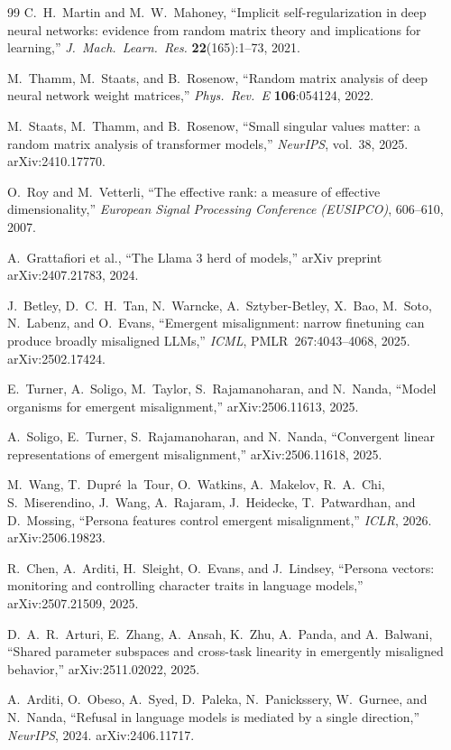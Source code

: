 \documentclass[11pt]{article}
\theoremstyle{definition}
\theoremstyle{remark}
\begin{document}
\begin{thebibliography}{99}
C.~H.~Martin and M.~W.~Mahoney,
``Implicit self-regularization in deep neural networks: evidence from random matrix theory
and implications for learning,''
\emph{J.\ Mach.\ Learn.\ Res.} \textbf{22}(165):1--73, 2021.

M.~Thamm, M.~Staats, and B.~Rosenow,
``Random matrix analysis of deep neural network weight matrices,''
\emph{Phys.\ Rev.\ E} \textbf{106}:054124, 2022.

M.~Staats, M.~Thamm, and B.~Rosenow,
``Small singular values matter: a random matrix analysis of transformer models,''
\emph{NeurIPS}, vol.~38, 2025. arXiv:2410.17770.

O.~Roy and M.~Vetterli,
``The effective rank: a measure of effective dimensionality,''
\emph{European Signal Processing Conference (EUSIPCO)}, 606--610, 2007.

A.~Grattafiori et al.,
``The Llama 3 herd of models,''
arXiv preprint arXiv:2407.21783, 2024.

J.~Betley, D.~C.~H.~Tan, N.~Warncke, A.~Sztyber-Betley, X.~Bao, M.~Soto, N.~Labenz, and O.~Evans,
``Emergent misalignment: narrow finetuning can produce broadly misaligned LLMs,''
\emph{ICML}, PMLR~267:4043--4068, 2025. arXiv:2502.17424.

E.~Turner, A.~Soligo, M.~Taylor, S.~Rajamanoharan, and N.~Nanda,
``Model organisms for emergent misalignment,''
arXiv:2506.11613, 2025.

A.~Soligo, E.~Turner, S.~Rajamanoharan, and N.~Nanda,
``Convergent linear representations of emergent misalignment,''
arXiv:2506.11618, 2025.

M.~Wang, T.~Dupr\'e~la~Tour, O.~Watkins, A.~Makelov, R.~A.~Chi, S.~Miserendino,
J.~Wang, A.~Rajaram, J.~Heidecke, T.~Patwardhan, and D.~Mossing,
``Persona features control emergent misalignment,''
\emph{ICLR}, 2026. arXiv:2506.19823.

R.~Chen, A.~Arditi, H.~Sleight, O.~Evans, and J.~Lindsey,
``Persona vectors: monitoring and controlling character traits in language models,''
arXiv:2507.21509, 2025.

D.~A.~R.~Arturi, E.~Zhang, A.~Ansah, K.~Zhu, A.~Panda, and A.~Balwani,
``Shared parameter subspaces and cross-task linearity in emergently misaligned behavior,''
arXiv:2511.02022, 2025.

A.~Arditi, O.~Obeso, A.~Syed, D.~Paleka, N.~Panickssery, W.~Gurnee, and N.~Nanda,
``Refusal in language models is mediated by a single direction,''
\emph{NeurIPS}, 2024. arXiv:2406.11717.


\end{thebibliography}
\end{document}
